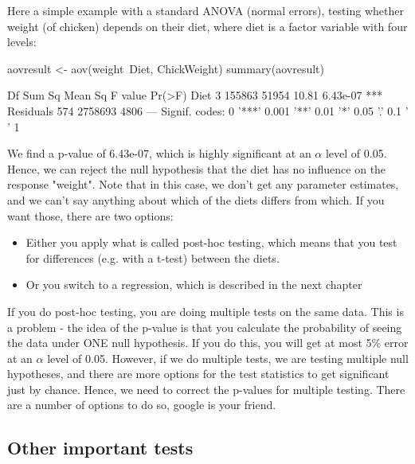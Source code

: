 \documentclass[a4paper,twoside]{tufte-book}\usepackage[]{graphicx}\usepackage[]{color}
\begin{document}
Here a simple example with a standard ANOVA (normal errors), testing whether weight (of chicken) depends on their diet, where diet is a factor variable with four levels:

\begin{Schunk}
\begin{Sinput}
aovresult <- aov(weight~Diet, ChickWeight)
summary(aovresult)
\end{Sinput}
\begin{Soutput}
             Df  Sum Sq Mean Sq F value   Pr(>F)    
Diet          3  155863   51954   10.81 6.43e-07 ***
Residuals   574 2758693    4806                     
---
Signif. codes:  0 '***' 0.001 '**' 0.01 '*' 0.05 '.' 0.1 ' ' 1
\end{Soutput}
\end{Schunk}

We find a p-value of  6.43e-07, which is highly significant at an $\alpha$ level of 0.05. Hence, we can reject the null hypothesis that the diet has no influence on the response "weight". Note that in this case, we don't get any parameter estimates, and we can't say anything about which of the diets differs from which. If you want those, there are two options:

\begin{itemize}
\item Either you apply what is called post-hoc testing, which means that you test for differences (e.g. with a t-test) between the diets.
\item Or you switch to a regression, which is described in the next chapter
\end{itemize}

If you do post-hoc testing, you are doing multiple tests on the same data. This is a problem - the idea of the p-value is that you calculate the probability of seeing the data under ONE null hypothesis. If you do this, you will get at most 5\% error at an $\alpha$ level of 0.05.  However, if we do multiple tests, we are testing multiple null hypotheses, and there are more options for the test statistics to get significant just by chance. Hence, we need to correct the p-values for multiple testing. There are a number of options to do so, google is your friend. 

\subsection{Other important tests}
\end{document}
